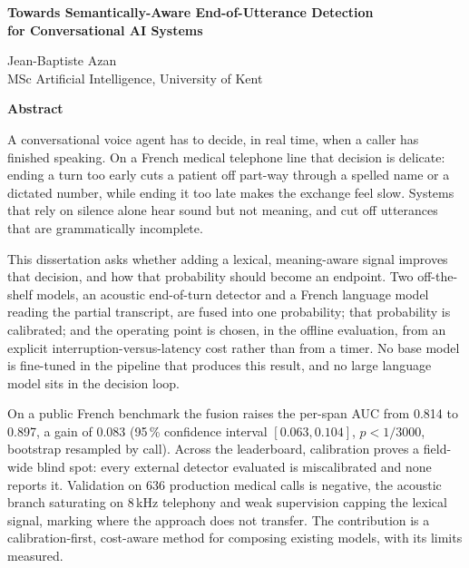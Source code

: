 \documentclass[12pt,a4paper]{article}
\begin{document}
\begin{center}
{\large\bfseries Towards Semantically-Aware End-of-Utterance Detection\\for Conversational AI Systems}

\medskip
Jean-Baptiste Azan\\
MSc Artificial Intelligence, University of Kent
\end{center}

\vspace{6mm}
\begin{center}\textbf{Abstract}\end{center}

A conversational voice agent has to decide, in real time, when a caller has finished
speaking. On a French medical telephone line that decision is delicate: ending a turn too
early cuts a patient off part-way through a spelled name or a dictated number, while ending
it too late makes the exchange feel slow. Systems that rely on silence alone hear sound but not meaning, and cut off utterances that
are grammatically incomplete.

This dissertation asks whether adding a lexical, meaning-aware signal improves that
decision, and how that probability should become an endpoint. Two off-the-shelf models, an acoustic end-of-turn detector and a French
language model reading the partial transcript, are fused into one probability; that
probability is calibrated; and the operating point is chosen, in the offline evaluation, from an explicit
interruption-versus-latency cost rather than from a timer. No base model is fine-tuned in the pipeline that produces this result, and no large language
model sits in the decision loop.

On a public French benchmark the fusion raises the per-span AUC from 0.814 to 0.897, a gain of 0.083 (95\,\% confidence interval $[0.063, 0.104]$, $p < 1/3000$, bootstrap
resampled by call). Across the
leaderboard, calibration proves a field-wide blind spot: every external detector evaluated
is miscalibrated and none reports it. Validation on 636 production medical calls is
negative, the acoustic branch saturating on 8\,kHz telephony and weak supervision capping
the lexical signal, marking where the approach does not transfer. The contribution is a calibration-first, cost-aware method for composing existing models,
with its limits measured.
\end{document}
